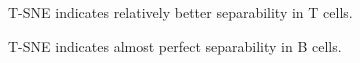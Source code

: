 \documentclass[3p,authoryear,preprint,12pt]{elsarticle}
\makeatletter
\def\fixFloatSize#1{}%
\makeatother
\begin{document}
\egroup
\bgroup
\fixFloatSize{img/TtSNE.png}
\begin{figure}[!htbp]
	\centering \makeatletter{}
	\makeatother 
	\caption{{T-SNE indicates relatively better separability in T cells.}}
	\label{f-c2b15a1baci9}
\end{figure}
\egroup
\bgroup
\fixFloatSize{img/BtSNE.png}
\begin{figure}[!htbp]
	\centering \makeatletter{}
	\makeatother 
	\caption{{T-SNE indicates almost perfect separability in B cells.}}
	\label{f-c2b15a1bacj9}
\end{figure}
\egroup
\bgroup
    
\end{document}

